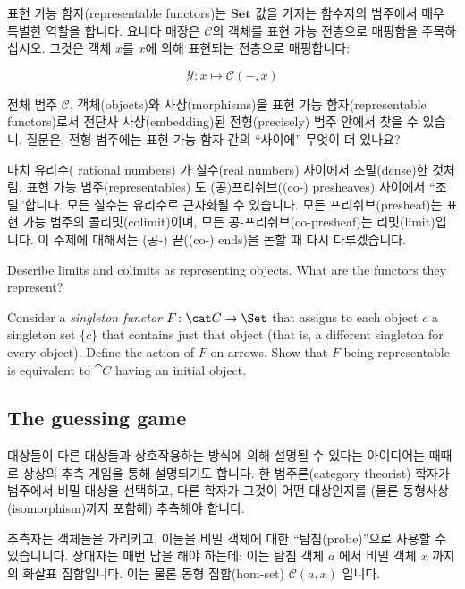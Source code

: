 \documentclass[DaoFP]{subfiles}
\begin{document}
표현 가능 함자(representable functors)는 $\mathbf{Set}$ 값을 가지는 함수자의 범주에서 매우 특별한 역할을 합니다. 요네다 매장은 $\mathcal{C}$의 객체를 표현 가능 전층으로 매핑함을 주목하십시오. 그것은 객체 $x$를 $x$에 의해 표현되는 전층으로 매핑합니다:

\[  \mathcal{Y} \colon x \mapsto \mathcal{C}(-, x) \]

전체 범주 $\mathcal{C}$, 객체(objects)와 사상(morphisms)을 표현 가능 함자(representable functors)로서 전단사 사상(embedding)된 전형(precisely) 범주 안에서 찾을 수 있습니.  
질문은, 전형 범주에는 표현 가능 함자 간의 ``사이에'' 무엇이 더 있나요?

마치 유리수( rational numbers) 가 실수(real numbers) 사이에서 조밀(dense)한 것처럼, 표현 가능 범주(representables) 도 (공)프리쉬브((co-) presheaves) 사이에서 ``조밀''합니다. 모든 실수는 유리수로 근사화될 수 있습니다. 모든 프리쉬브(presheaf)는 표현 가능 범주의 콜리밋(colimit)이며, 모든 공-프리쉬브(co-presheaf)는 리밋(limit)입니다. 이 주제에 대해서는 (공-) 끝((co-) ends)을 논할 때 다시 다루겠습니다.

\begin{exercise}
Describe limits and colimits as representing objects. What are the functors they represent?
\end{exercise}
\begin{exercise}
Consider a \emph{singleton functor} $F \colon \cat C \to \Set$ that assigns to each object $c$ a singleton set $\{c\}$ that contains just that object (that is, a different singleton for every object). Define the action of $F$ on arrows. Show that $F$ being representable is equivalent to $\cat C$ having an initial object.
\end{exercise}

\subsection{The guessing game}

대상들이 다른 대상들과 상호작용하는 방식에 의해 설명될 수 있다는 아이디어는 때때로 상상의 추측 게임을 통해 설명되기도 합니다. 한 범주론(category theorist) 학자가 범주에서 비밀 대상을 선택하고, 다른 학자가 그것이 어떤 대상인지를 (물론 동형사상(isomorphism)까지 포함해) 추측해야 합니다.

추측자는 객체들을 가리키고, 이들을 비밀 객체에 대한 ``탐침(probe)''으로 사용할 수 있습니니다. 상대자는 매번 답을 해야 하는데: 이는 탐침 객체 $a$ 에서 비밀 객체 $x$ 까지의 화살표 집합입니다. 이는 물론 동형 집합(hom-set) $\mathcal{C}(a, x)$ 입니다.
\end{document}
